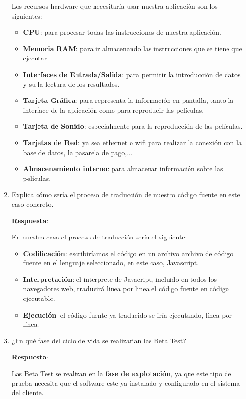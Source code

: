 \begin{enumerate}
    Los recursos hardware que necesitaría usar nuestra aplicación son los siguientes:
    \begin{itemize}
        \item \textbf{CPU}: para procesar todas las instrucciones de nuestra aplicación.
        \item \textbf{Memoria RAM}: para ir almacenando las instrucciones que se tiene que ejecutar.
        \item \textbf{Interfaces de Entrada/Salida}: para permitir la introducción de datos y su la lectura de los resultados.
        \item \textbf{Tarjeta Gráfica}: para representa la información en pantalla, tanto la interface de la aplicación como para reproducir las películas.
        \item \textbf{Tarjeta de Sonido}: especialmente para la reproducción de las películas.
        \item \textbf{Tarjetas de Red}: ya sea ethernet o wifi para realizar la conexión con la base de datos, la pasarela de pago,...
        \item \textbf{Almacenamiento interno}: para almacenar información sobre las películas.
    \end{itemize}

     \item Explica cómo sería el proceso de traducción de nuestro código fuente en este caso concreto.

     \textbf{Respuesta}:

     En nuestro caso el proceso de traducción sería el siguiente:
     \begin{itemize}
         \item \textbf{Codificación}: escribiríamos el código en un archivo archivo de código fuente en el lenguaje seleccionado, en este caso, Javascript.
         \item \textbf{Interpretación}: el interprete de Javacript, incluido en todos los navegadores web, traducirá linea por linea el código fuente en código ejecutable.
         \item \textbf{Ejecución}: el código fuente ya traducido se iría ejecutando, línea por línea.
     \end{itemize}

     \item ¿En qué fase del ciclo de vida se realizarían las Beta Test?

     \textbf{Respuesta}:

     Las Beta Test se realizan en la \textbf{fase de explotación}, ya que este tipo de prueba necesita que el software este ya instalado y configurado en el sistema del cliente.


\end{enumerate}
